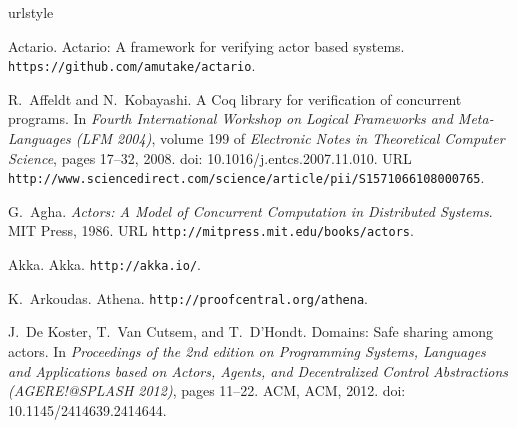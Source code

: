 \documentclass[10pt]{sigplanconf}
\begin{document}
















\begin{thebibliography}{15}
\softraggedright
\providecommand{\natexlab}[1]{#1}
\providecommand{\url}[1]{\texttt{#1}}
\expandafter\ifx\csname urlstyle\endcsname\relax
  \providecommand{\doi}[1]{doi: #1}\else
  \providecommand{\doi}{doi: \begingroup \urlstyle{rm}\Url}\fi

Actario.
\newblock Actario: A framework for verifying actor based systems.
\newblock \url{https://github.com/amutake/actario}.

R.~Affeldt and N.~Kobayashi.
\newblock A {Coq} library for verification of concurrent programs.
\newblock In \emph{Fourth International Workshop on Logical Frameworks and
  Meta-Languages (LFM 2004)}, volume 199 of \emph{Electronic Notes in
  Theoretical Computer Science}, pages 17--32, 2008.
\newblock \doi{10.1016/j.entcs.2007.11.010}.
\newblock URL
  \url{http://www.sciencedirect.com/science/article/pii/S1571066108000765}.

G.~Agha.
\newblock \emph{Actors: A Model of Concurrent Computation in Distributed
  Systems}.
\newblock MIT Press, 1986.
\newblock URL \url{http://mitpress.mit.edu/books/actors}.

Akka.
\newblock Akka.
\newblock \url{http://akka.io/}.

K.~Arkoudas.
\newblock Athena.
\newblock \url{http://proofcentral.org/athena}.

J.~{De Koster}, T.~{Van Cutsem}, and T.~D'Hondt.
\newblock Domains: Safe sharing among actors.
\newblock In \emph{Proceedings of the 2nd edition on Programming Systems,
  Languages and Applications based on Actors, Agents, and Decentralized Control
  Abstractions (AGERE!@SPLASH 2012)}, pages 11--22. ACM, ACM, 2012.
\newblock \doi{10.1145/2414639.2414644}.


\end{thebibliography}
\end{document}
